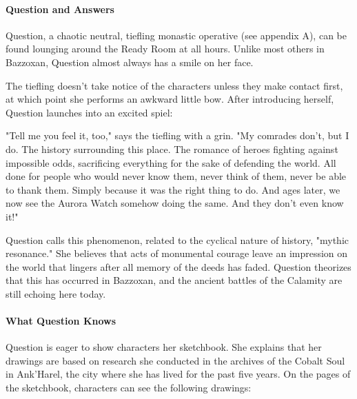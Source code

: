 \documentclass[10pt,a4paper,twoside,bg=print,twocolumn,openany,nodeprecatedcode]{dndbook}
\begin{document}
\paragraph{Question and Answers}
Question, a chaotic neutral, tiefling monastic operative (see appendix A), can be found lounging around the Ready Room at all hours. Unlike most others in Bazzoxan, Question almost always has a smile on her face.

The tiefling doesn't take notice of the characters unless they make contact first, at which point she performs an awkward little bow. After introducing herself, Question launches into an excited spiel:

\begin{DndReadAloud}{}
"Tell me you feel it, too," says the tiefling with a grin. "My comrades don't, but I do. The history surrounding this place. The romance of heroes fighting against impossible odds, sacrificing everything for the sake of defending the world. All done for people who would never know them, never think of them, never be able to thank them. Simply because it was the right thing to do. And ages later, we now see the Aurora Watch somehow doing the same. And they don't even know it!"

\end{DndReadAloud}

Question calls this phenomenon, related to the cyclical nature of history, "mythic resonance." She believes that acts of monumental courage leave an impression on the world that lingers after all memory of the deeds has faded. Question theorizes that this has occurred in Bazzoxan, and the ancient battles of the Calamity are still echoing here today.

\paragraph{What Question Knows}
Question is eager to show characters her sketchbook. She explains that her drawings are based on research she conducted in the archives of the Cobalt Soul in Ank'Harel, the city where she has lived for the past five years. On the pages of the sketchbook, characters can see the following drawings:
\end{document}
